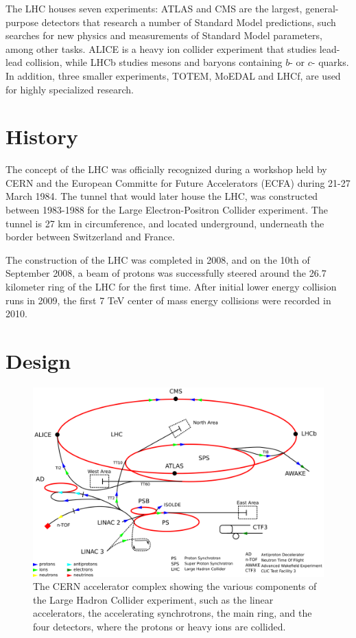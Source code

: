 \documentclass[12pt,a4paper,openright,twoside]{report}
\begin{document}
The LHC houses seven experiments: ATLAS and CMS are the largest, general-purpose detectors that research a number of Standard Model predictions, such searches for new physics and measurements of Standard Model parameters, among other tasks. ALICE is a heavy ion collider experiment that studies lead-lead collision, while LHCb studies mesons and baryons containing $b$- or $c$- quarks. In addition, three smaller experiments, TOTEM, MoEDAL and LHCf, are used for highly specialized research.

\section{History}
The concept of the LHC was officially recognized during a workshop held by CERN and the European Committe for Future Accelerators (ECFA) during 21-27 March 1984. The tunnel that would later house the LHC, was constructed between 1983-1988 for the Large Electron-Positron Collider experiment. The tunnel is 27 km in circumference, and located underground, underneath the border between Switzerland and France.

The construction of the LHC was completed in 2008, and on the 10th of September 2008, a beam of protons was successfully steered around the 26.7 kilometer ring of the LHC for the first time. After initial lower energy collision runs in 2009, the first 7 TeV center of mass energy collisions were recorded in 2010.
\vfill

\section{Design}
\begin{figure}[H]
\centering
	\includegraphics[width=0.9\linewidth]{Cern_accelerator_complex.png}
	\caption{The CERN accelerator complex showing the various components of the Large Hadron Collider experiment, such as the linear accelerators, the accelerating synchrotrons, the main ring, and the four detectors, where the protons or heavy ions are collided.}
		\label{fig:LHCring}
\end{figure}
\end{document}
